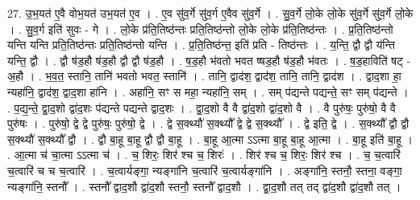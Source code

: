 \documentclass[17pt]{extarticle}
\begin{document}
27. उ॒भ॒यत॑ ए॒वै वोभ॒यत॑ उभ॒यत॑ ए॒व । . ए॒व सु॑व॒र्गे सु॑व॒र्ग ए॒वैव सु॑व॒र्गे । . सु॒व॒र्गे लो॒के लो॒के सु॑व॒र्गे सु॑व॒र्गे लो॒के । . सु॒व॒र्ग इति॑ सुवः - गे । . लो॒के प्र॑ति॒तिष्ठ॑न्तः प्रति॒तिष्ठ॑न्तो लो॒के लो॒के प्र॑ति॒तिष्ठ॑न्तः । . प्र॒ति॒तिष्ठ॑न्तो यन्ति यन्ति प्रति॒तिष्ठ॑न्तः प्रति॒तिष्ठ॑न्तो यन्ति । . प्र॒ति॒तिष्ठ॑न्त॒ इति॑ प्रति - तिष्ठ॑न्तः । . य॒न्ति॒ द्वौ द्वौ य॑न्ति यन्ति॒ द्वौ । . द्वौ ष॑ड॒हौ ष॑ड॒हौ द्वौ द्वौ ष॑ड॒हौ । . ष॒ड॒हौ भ॑वतो भवत ष्षड॒हौ ष॑ड॒हौ भ॑वतः । . ष॒ड॒हाविति॑ षट् - अ॒हौ । . भ॒व॒त॒ स्तानि॒ तानि॑ भवतो भवत॒ स्तानि॑ । . तानि॒ द्वाद॑श॒ द्वाद॑श॒ तानि॒ तानि॒ द्वाद॑श । . द्वाद॒शा हा॒ न्यहा॑नि॒ द्वाद॑श॒ द्वाद॒शा हा॑नि । . अहा॑नि॒ सꣳ स महा॒ न्यहा॑नि॒ सम् । . सम् प॑द्यन्ते पद्यन्ते॒ सꣳ सम् प॑द्यन्ते । . प॒द्य॒न्ते॒ द्वा॒द॒शो द्वा॑द॒शः प॑द्यन्ते पद्यन्ते द्वाद॒शः । . द्वा॒द॒शो वै वै द्वा॑द॒शो द्वा॑द॒शो वै । . वै पुरु॑षः॒ पुरु॑षो॒ वै वै पुरु॑षः । . पुरु॑षो॒ द्वे द्वे पुरु॑षः॒ पुरु॑षो॒ द्वे । . द्वे स॒क्थ्यौ॑ स॒क्थ्यौ᳚ द्वे द्वे स॒क्थ्यौ᳚ । . द्वे इति॒ द्वे । . स॒क्थ्यौ᳚ द्वौ द्वौ स॒क्थ्यौ॑ स॒क्थ्यौ᳚ द्वौ । . द्वौ बा॒हू बा॒हू द्वौ द्वौ बा॒हू । . बा॒हू आ॒त्मा ऽऽत्मा बा॒हू बा॒हू आ॒त्मा । . बा॒हू इति॑ बा॒हू । . आ॒त्मा च॑ चा॒त्मा ऽऽत्मा च॑ । . च॒ शिरः॒ शिर॑ श्च च॒ शिरः॑ । . शिर॑ श्च च॒ शिरः॒ शिर॑ श्च । . च॒ च॒त्वारि॑ च॒त्वारि॑ च च च॒त्वारि॑ । . च॒त्वार्यङ्गा॒ न्यङ्गा॑नि च॒त्वारि॑ च॒त्वार्यङ्गा॑नि । . अङ्गा॑नि॒ स्तनौ॒ स्तना॒ वङ्गा॒ न्यङ्गा॑नि॒ स्तनौ᳚ । . स्तनौ᳚ द्वाद॒शौ द्वा॑द॒शौ स्तनौ॒ स्तनौ᳚ द्वाद॒शौ । . द्वा॒द॒शौ तत् तद् द्वा॑द॒शौ द्वा॑द॒शौ तत् । \newline
\end{document}
